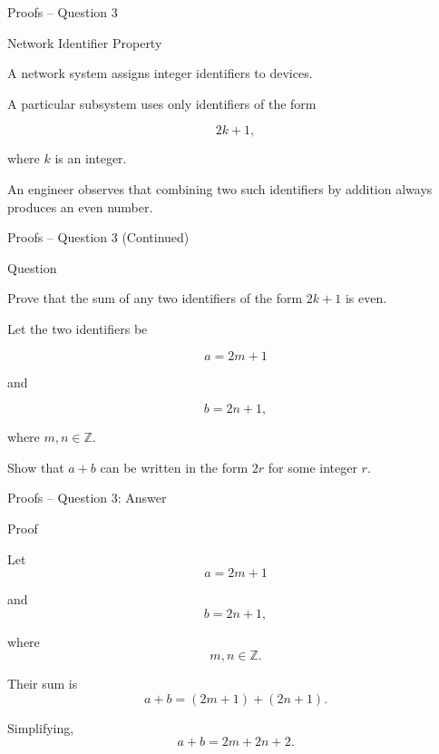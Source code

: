 
\begin{frame}{Proofs -- Question 3}

\begin{block}{Network Identifier Property}

A network system assigns integer identifiers to devices.

A particular subsystem uses only identifiers of the form

\[
2k+1,
\]

where $k$ is an integer.

An engineer observes that combining two such identifiers by addition
always produces an even number.

\end{block}

\end{frame}


\begin{frame}{Proofs -- Question 3 (Continued)}

\begin{block}{Question}

Prove that the sum of any two identifiers of the form $2k+1$ is even.

\medskip

Let the two identifiers be

\[
a=2m+1
\]

and

\[
b=2n+1,
\]

where $m,n\in\mathbb{Z}$.

Show that $a+b$ can be written in the form $2r$ for some integer $r$.

\end{block}

\end{frame}


\begin{frame}{Proofs -- Question 3: Answer}
\vspace{-0.5cm}
\begin{exampleblock}{Proof}

Let
\[
a=2m+1
\]

and
\[
b=2n+1,
\]

where
\[
m,n\in\mathbb{Z}.
\]

Their sum is
\[
a+b=(2m+1)+(2n+1).
\]

Simplifying,
\[
a+b=2m+2n+2.
\]

\end{exampleblock}

\end{frame}

